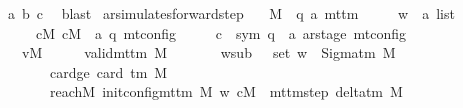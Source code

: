 \begin{isabellebody}
\ a\ b\ c\ \isamarkupfalse%
\ blast\isanewline
{}\isamarkupfalse%
%
\endisatagproof
{\isafoldproof}%
%
\isadelimproof
\isanewline
%
\endisadelimproof
\isanewline
{}\isamarkupfalse%
\ ar{\isacharunderscore}{\kern0pt}simulates{\isacharunderscore}{\kern0pt}forward{\isacharunderscore}{\kern0pt}step{\isacharcolon}{\kern0pt}\isanewline
\ \ \ M\ {\isacharcolon}{\kern0pt}{\isacharcolon}{\kern0pt}\ {\isachardoublequoteopen}{\isacharparenleft}{\kern0pt}{\isacharprime}{\kern0pt}q{\isacharcomma}{\kern0pt}\ {\isacharprime}{\kern0pt}a{\isacharparenright}{\kern0pt}\ mttm{\isachardoublequoteclose}\isanewline
\ \ \ \ \ w\ {\isacharcolon}{\kern0pt}{\isacharcolon}{\kern0pt}\ {\isachardoublequoteopen}{\isacharprime}{\kern0pt}a\ list{\isachardoublequoteclose}\isanewline
\ \ \ \ \ cM\ cM{\isacharunderscore}{\kern0pt}{}\ {\isacharcolon}{\kern0pt}{\isacharcolon}{\kern0pt}\ {\isachardoublequoteopen}{\isacharparenleft}{\kern0pt}{\isacharprime}{\kern0pt}a{\isacharcomma}{\kern0pt}\ {\isacharprime}{\kern0pt}q{\isacharparenright}{\kern0pt}\ mt{\isacharunderscore}{\kern0pt}config{\isachardoublequoteclose}\isanewline
\ \ \ \ \ c{\isacharprime}{\kern0pt}\ {\isacharcolon}{\kern0pt}{\isacharcolon}{\kern0pt}\ {\isachardoublequoteopen}{\isacharparenleft}{\kern0pt}sym{}{\isacharcomma}{\kern0pt}\ {\isacharprime}{\kern0pt}q\ {\isasymtimes}\ {\isacharprime}{\kern0pt}a\ ar{\isacharunderscore}{\kern0pt}stage{\isacharparenright}{\kern0pt}\ mt{\isacharunderscore}{\kern0pt}config{\isachardoublequoteclose}\isanewline
\ \ \ vM{\isacharcolon}{\kern0pt}\ \ \ \ \ \ {\isachardoublequoteopen}valid{\isacharunderscore}{\kern0pt}mttm\ M{\isachardoublequoteclose}\isanewline
\ \ \ \ \ \ \ w{\isacharunderscore}{\kern0pt}sub{\isacharcolon}{\kern0pt}\ \ \ {\isachardoublequoteopen}set\ w\ {\isasymsubseteq}\ Sigma{\isacharunderscore}{\kern0pt}tm\ M{\isachardoublequoteclose}\isanewline
\ \ \ \ \ \ \ card{\isacharunderscore}{\kern0pt}ge{\isacharcolon}{\kern0pt}\ {\isachardoublequoteopen}card\ {\isacharparenleft}{\kern0pt}{\isasymGamma}{\isacharunderscore}{\kern0pt}tm\ M{\isacharparenright}{\kern0pt}\ {\isasymge}\ {}{\isachardoublequoteclose}\isanewline
\ \ \ \ \ \ \ reach{\isacharunderscore}{\kern0pt}M{\isacharcolon}{\kern0pt}\ {\isachardoublequoteopen}{\isacharparenleft}{\kern0pt}init{\isacharunderscore}{\kern0pt}config{\isacharunderscore}{\kern0pt}mttm\ M\ w{\isacharcomma}{\kern0pt}\ cM{\isacharparenright}{\kern0pt}\ {\isasymin}\ {\isacharparenleft}{\kern0pt}mttm{\isacharunderscore}{\kern0pt}step\ {\isacharparenleft}{\kern0pt}delta{\isacharunderscore}{\kern0pt}tm\ M{\isacharparenright}{\kern0pt}{\isacharparenright}{\kern0pt}\isactrlsup {\isacharasterisk}{\kern0pt}{\isachardoublequoteclose}\isanewline

\end{isabellebody}
